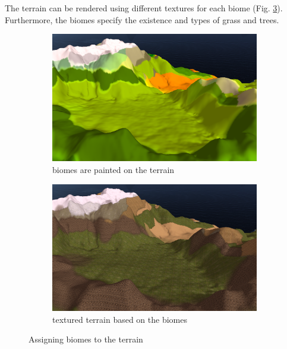 \documentclass[journal, letterpaper]{IEEEtran}
\begin{document}
The terrain can be rendered using different textures for each biome (Fig. \ref{fig:terrainBiomes}). Furthermore, the biomes specify the existence and types of grass and trees.
\begin{figure}
	\centering
	\begin{subfigure}[b]{0.45\textwidth}
		\includegraphics[width=\textwidth]{images/TerrainBiomes1}
		\caption{biomes are painted on the terrain}
		\label{fig:terrainBiomes1}
	\end{subfigure}
	\begin{subfigure}[b]{0.45\textwidth}
		\includegraphics[width=\textwidth]{images/TerrainBiomes2}
		\caption{textured terrain based on the biomes}
		\label{fig:terrainBiomes2}
	\end{subfigure}
	\caption{Assigning biomes to the terrain}\label{fig:terrainBiomes}
\end{figure}
\end{document}
